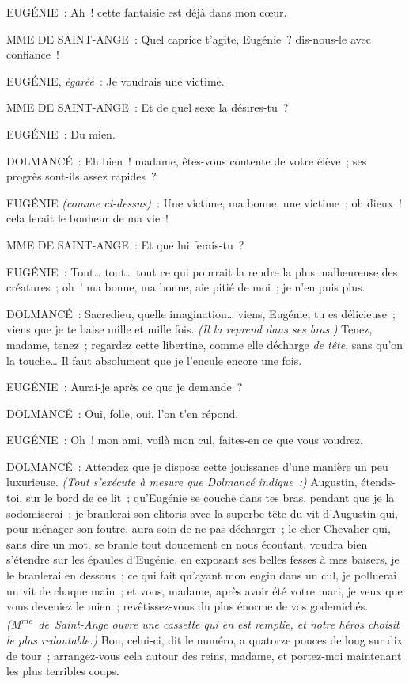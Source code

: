 \documentclass[french,twoside]{book} %
\begin{document}
EUGÉNIE : Ah ! cette fantaisie est déjà dans mon cœur.\par
MME DE SAINT-ANGE : Quel caprice t’agite, Eugénie ? dis-nous-le avec confiance !\par
EUGÉNIE, {\itshape égarée} : Je voudrais une victime.\par
MME DE SAINT-ANGE : Et de quel sexe la désires-tu ?\par
EUGÉNIE : Du mien.\par
DOLMANCÉ : Eh bien ! madame, êtes-vous contente de votre élève ; ses progrès sont-ils assez rapides ?\par
EUGÉNIE {\itshape (comme ci-dessus)} : Une victime, ma bonne, une victime ; oh dieux ! cela ferait le bonheur de ma vie !\par
MME DE SAINT-ANGE : Et que lui ferais-tu ?\par
EUGÉNIE : Tout… tout… tout ce qui pourrait la rendre la plus malheureuse des créatures ; oh ! ma bonne, ma bonne, aie pitié de moi ; je n’en puis plus.\par
DOLMANCÉ : Sacredieu, quelle imagination… viens, Eugénie, tu es délicieuse ; viens que je te baise mille et mille fois. {\itshape (Il la reprend dans ses bras.)} Tenez, madame, tenez ; regardez cette libertine, comme elle décharge {\itshape de tête}, sans qu’on la touche… Il faut absolument que je l’encule encore une fois.\par
EUGÉNIE : Aurai-je après ce que je demande ?\par
DOLMANCÉ : Oui, folle, oui, l’on t’en répond.\par
EUGÉNIE : Oh ! mon ami, voilà mon cul, faites-en ce que vous voudrez.\par
DOLMANCÉ : Attendez que je dispose cette jouissance d’une manière un peu luxurieuse. {\itshape (Tout s’exécute à mesure que Dolmancé indique :)} Augustin, étends-toi, sur le bord de ce lit ; qu’Eugénie se couche dans tes bras, pendant que je la sodomiserai ; je branlerai son clitoris avec la superbe tête du vit d’Augustin qui, pour ménager son foutre, aura soin de ne pas décharger ; le cher Chevalier qui, sans dire un mot, se branle tout doucement en nous écoutant, voudra bien s’étendre sur les épaules d’Eugénie, en exposant ses belles fesses à mes baisers, je le branlerai en dessous ; ce qui fait qu’ayant mon engin dans un cul, je polluerai un vit de chaque main ; et vous, madame, après avoir été votre mari, je veux que vous deveniez le mien ; revêtissez-vous du plus énorme de vos godemichés. {\itshape (M\textsuperscript{me} de Saint-Ange ouvre une cassette qui en est remplie, et notre héros choisit le plus redoutable.)} Bon, celui-ci, dit le numéro, a quatorze pouces de long sur dix de tour ; arrangez-vous cela autour des reins, madame, et portez-moi maintenant les plus terribles coups.\par
\end{document}
